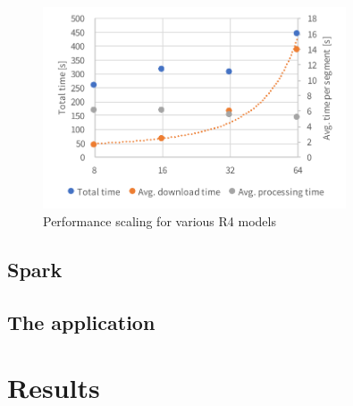 \documentclass{article}
\begin{document}
\begin{figure}[H]
	\centering
	\includegraphics[width=0.8\textwidth]{resource/r4-scaling.pdf}
	\caption{Performance scaling for various R4 models}
	\label{fig:r4-scaling}
\end{figure}

\subsection{Spark}

\subsection{The application}


\section{Results}



\printbibliography
\end{document}
